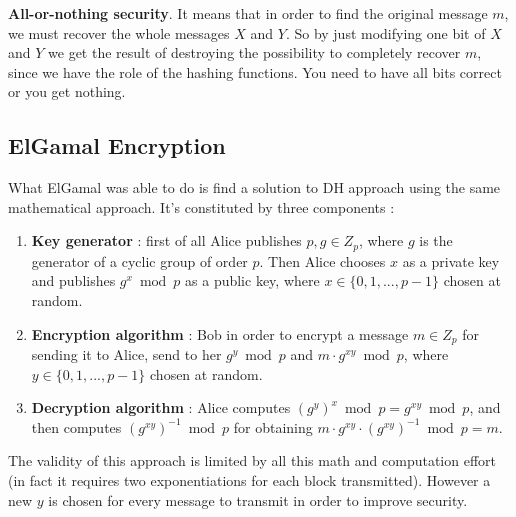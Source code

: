 \documentclass[11pt]{article}
\begin{document}
\textbf{All-or-nothing security}. It means that in order to find the original message $m$, we must recover the whole messages $X$ and $Y$. So by just modifying one bit of $X$ and $Y$ we get the result of destroying the possibility to completely recover $m$, since we have the role of the hashing functions. You need to have all bits correct or you get nothing.
\subsection{ElGamal Encryption}
What ElGamal was able to do is find a solution to DH approach using the same mathematical approach. It's constituted by three components :
\begin{enumerate}
\item \textbf{Key generator} : first of all Alice publishes $p, g \in Z_p$, where $g$ is the generator of a cyclic group of order $p$. Then Alice chooses $x$ as a private key and publishes $g^x \bmod p$ as a public key, where $x \in \{0, 1, ..., p - 1\}$ chosen at random.
\item \textbf{Encryption algorithm} : Bob in order to encrypt a message $m \in Z_p$ for sending it to Alice, send to her $g^y \bmod p$ and $m \cdot g^{xy} \bmod p$, where $y \in \{0, 1, ..., p - 1\}$ chosen at random.
\item \textbf{Decryption algorithm} : Alice computes $(g^y)^x \bmod p = g^{xy} \bmod p$, and then computes $(g^{xy})^{-1} \bmod p$ for obtaining $m \cdot g^{xy} \cdot (g^{xy})^{-1} \bmod p = m$.
\end{enumerate} 
The validity of this approach is limited by all this math and computation effort (in fact it requires two exponentiations for each block transmitted). However a new $y$ is chosen for every message to transmit in order to improve security.
\end{document}
